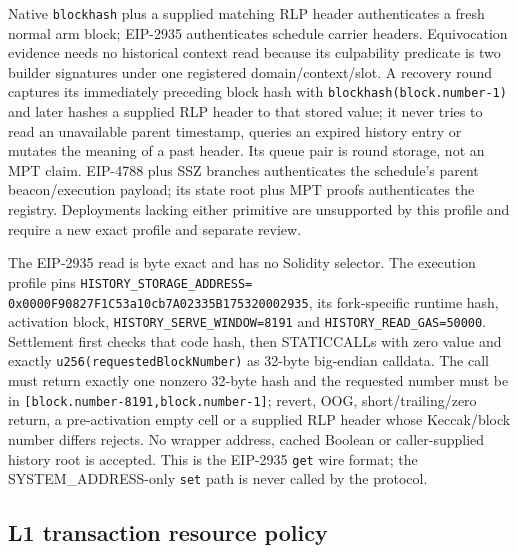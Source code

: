 \documentclass[a4paper,11pt]{article}
\newcommand{\code}[1]{\nolinkurl{#1}}
\begin{document}
Native \code{blockhash} plus a supplied matching RLP header authenticates a
fresh normal arm block; EIP-2935 authenticates schedule carrier headers.
Equivocation evidence needs no historical context read because its culpability
predicate is two builder signatures under one registered domain/context/slot.
A
recovery round captures its immediately preceding block hash with
\code{blockhash(block.number-1)} and later hashes a supplied RLP header to that
stored value; it never tries to read an unavailable parent timestamp, queries
an expired history entry or mutates the meaning of a past header.  Its queue
pair is round storage, not an MPT claim.
EIP-4788 plus SSZ branches
authenticates the schedule's parent beacon/execution payload; its state root
plus MPT proofs authenticates the registry.  Deployments lacking either
primitive are unsupported by this profile and require a new exact profile and
separate review.

The EIP-2935 read is byte exact and has no Solidity selector.  The execution
profile pins \code{HISTORY_STORAGE_ADDRESS=
0x0000F90827F1C53a10cb7A02335B175320002935}, its fork-specific runtime hash,
activation block, \code{HISTORY_SERVE_WINDOW=8191} and
\code{HISTORY_READ_GAS=50000}.  Settlement first checks that code hash, then
STATICCALLs with zero value and exactly
\code{u256(requestedBlockNumber)} as 32-byte big-endian calldata.  The call must
return exactly one nonzero 32-byte hash and the requested number must be in
\code{[block.number-8191,block.number-1]}; revert, OOG, short/trailing/zero
return, a pre-activation empty cell or a supplied RLP header whose Keccak/block
number differs rejects.  No wrapper address, cached Boolean or caller-supplied
history root is accepted.  This is the EIP-2935 \code{get} wire format; the
SYSTEM\_ADDRESS-only \code{set} path is never called by the protocol.

\subsection{L1 transaction resource policy}\label{sec:l1-resources}
\end{document}
